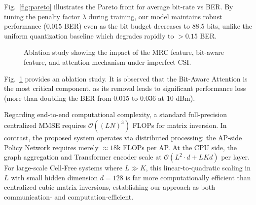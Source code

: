 Fig.~\ref{fig:pareto} illustrates the Pareto front for average bit-rate vs BER. By tuning the penalty factor $\lambda$ during training, our model maintains robust performance ($0.015$ BER) even as the bit budget decreases to 88.5 bits, unlike the uniform quantization baseline which degrades rapidly to $>0.15$ BER.

\begin{figure}[t]
    \centering
    
    \caption{Ablation study showing the impact of the MRC feature, bit-aware feature, and attention mechanism under imperfect CSI.}
    \label{fig:ablation}
\end{figure}

Fig.~\ref{fig:ablation} provides an ablation study. It is observed that the Bit-Aware Attention is the most critical component, as its removal leads to significant performance loss (more than doubling the BER from $0.015$ to $0.036$ at 10 dBm). 

Regarding end-to-end computational complexity, a standard full-precision centralized MMSE requires $\mathcal{O}((LN)^3)$ FLOPs for matrix inversion. In contrast, the proposed system operates via distributed processing: the AP-side Policy Network requires merely $\approx 18$k FLOPs per AP. At the CPU side, the graph aggregation and Transformer encoder scale at $\mathcal{O}(L^2 \cdot d + L K d)$ per layer. For large-scale Cell-Free systems where $L \gg K$, this linear-to-quadratic scaling in $L$ with small hidden dimension $d=128$ is far more computationally efficient than centralized cubic matrix inversions, establishing our approach as both communication- and computation-efficient.